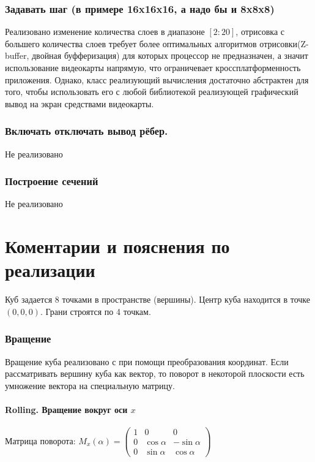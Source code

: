 \documentclass[a4paper,11pt]{article}
\begin{document}
    \section*{Задавать шаг (в примере 16x16x16, а надо бы и 8x8x8)}
         
      Реализовано изменение количества слоев в диапазоне $[2:20]$, отрисовка с большего количества слоев требует более оптимальных алгоритмов отрисовки(Z-buffer, двойная буфферизация) для которых процессор не предназначен, а значит использование видеокарты напрямую, что ограничевает \linebreak
      кроссплатформенность приложения. Однако, класс реализующий вычисления достаточно абстрактен для того, чтобы использовать его с любой библиотекой реализующей графический вывод на экран средствами видеокарты. 
    \section*{Включать отключать вывод рёбер.  }
    Не реализовано
    \section* {Построение сечений}
    Не реализовано
         
        
  
  
 
  \newpage
  \part{Коментарии и пояснения по реализации}
  Куб задается 8 точками в пространстве (вершины). Центр куба находится в точке $(0,0,0)$. Грани строятся по 4 точкам.
  \section{Вращение}
  Вращение куба реализовано с при помощи преобразования координат. Если рассматривать вершину куба как вектор, то поворот в некоторой плоскости есть умножение вектора на специальную матрицу.
  
  \subsection*{Rolling. Вращение вокруг оси $x$}
  Матрица поворота: $M_x(\alpha) =
  \begin{pmatrix}    
1 &   0           & 0           \\
0 & \cos \alpha   &  -\sin \alpha \\
0 & \sin \alpha & \cos \alpha 
 \end{pmatrix}$
 
\end{document}
